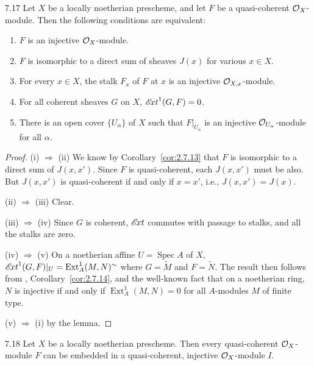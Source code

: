 \begin{bookproposition}{7.17}\label{prop:2.7.17}
Let $X$ be a locally noetherian prescheme, and let $F$ be a quasi-coherent $\mathcal{O}_X$-module. Then the following conditions are equivalent:
\begin{enumerate}
\item[(i)] $F$ is an injective $\mathcal{O}_X$-module.
\item[(ii)] $F$ is isomorphic to a direct sum of sheaves $J(x)$ for various $x\in X$.
\item[(iii)] For every $x\in X$, the stalk $F_x$ of $F$ at $x$ is an injective $\mathcal{O}_{X,x}$-module.
\item[(iv)] For all coherent sheaves $G$ on $X$, $\mathop{\mathscr{E}\!xt}\nolimits^1(G,F)=0$.
\item[(v)] There is an open cover $\{U_\alpha\}$ of $X$ such that $F|_{U_\alpha}$ is an injective $\mathcal{O}_{U_\alpha}$-module for all $\alpha$.
\end{enumerate}
\end{bookproposition}

\begin{proof}
(i) $\Longrightarrow$ (ii) We know by Corollary~\ref{cor:2.7.13} that $F$ is isomorphic to a direct sum of $J(x,x')$. Since $F$ is quasi-coherent, each $J(x,x')$ must be also. But $J(x,x')$ is quasi-coherent if and only if $x=x'$, i.e., $J(x,x')=J(x)$.

(ii) $\Longrightarrow$ (iii) Clear.

(iii) $\Longrightarrow$ (iv) Since $G$ is coherent, $\mathop{\mathscr{E}\!xt}\nolimits$ commutes with passage to stalks, and all the stalks are zero.

(iv) $\Longrightarrow$ (v) On a noetherian affine $U=\operatorname{Spec}A$ of $X$, $\mathop{\mathscr{E}\!xt}\nolimits^1(G,F)|_U=\operatorname{Ext}^1_A(M,N)^{\sim}$ where $G=\widetilde{M}$ and $F=\widetilde{N}$. The result then follows from \cite[\nopp I,~9.4.8]{EGA}, Corollary~\ref{cor:2.7.14}, and the well-known fact that on a noetherian ring, $N$ is injective if and only if $\operatorname{Ext}^1_A(M,N)=0$ for all $A$-modules $M$ of finite type.

(v) $\Longrightarrow$ (i) by the lemma.
\end{proof}

\begin{booktheorem}{7.18}\label{thm:2.7.18}
Let $X$ be a locally noetherian prescheme. Then every quasi-coherent $\mathcal{O}_X$-module $F$ can be embedded in a quasi-coherent, injective $\mathcal{O}_X$-module $I$.
\end{booktheorem}

